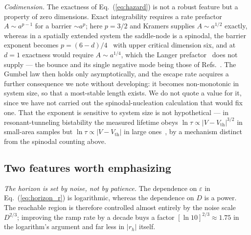 \documentclass[%
 twocolumn,
 superscriptaddress,
 amsmath,amssymb,
 aps,
 pre,
 floatfix,
]{revtex4-2}
\begin{document}
\emph{Codimension.}  The exactness of Eq.~(\ref{eq:hazard}) is not a robust feature but a property of zero dimensions.  Exact integrability requires a rate prefactor $A\sim a^{p-1}$ for a barrier $\sim a^{p}$; here $p=3/2$ and Kramers supplies $A\sim a^{1/2}$ exactly, whereas in a spatially extended system the saddle-node is a spinodal, the barrier exponent becomes $p=(6-d)/4$~\cite{UngerKlein1984} with upper critical dimension six, and at $d=1$ exactness would require $A\sim a^{1/4}$, which the Langer prefactor~\cite{Langer1969} does not supply --- the bounce and its single negative mode being those of Refs.~\cite{Coleman1977,CallanColeman1977}.  The Gumbel law then holds only asymptotically, and the escape rate acquires a further consequence we note without developing: it becomes non-monotonic in system size, so that a most-stable length exists.  We do not quote a value for it, since we have not carried out the spinodal-nucleation calculation that would fix one.  That the exponent is sensitive to system size is not hypothetical --- in resonant-tunneling bistability the measured lifetime obeys $\ln\tau\propto|V-V_{\mathrm{th}}|^{3/2}$ in small-area samples but $\ln\tau\propto|V-V_{\mathrm{th}}|$ in large ones~\cite{Tretiakov2003}, by a mechanism distinct from the spinodal counting above.

\subsection{Two features worth emphasizing}

\emph{The horizon is set by noise, not by patience.}  The dependence on $\varepsilon$ in Eq.~(\ref{eq:horizon_r}) is logarithmic, whereas the dependence on $D$ is a power.  The reachable region is therefore controlled almost entirely by the noise scale $D^{2/3}$; improving the ramp rate by a decade buys a factor $[\ln 10]^{2/3}\approx1.75$ in the logarithm's argument and far less in $|r_h|$ itself.
\end{document}
